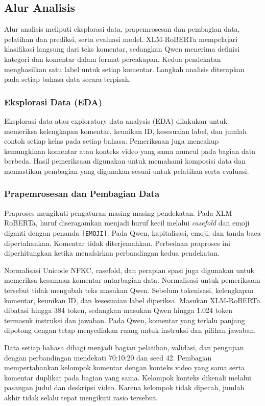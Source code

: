 \documentclass[11pt]{article}
\begin{document}
\subsection{Alur Analisis}
Alur analisis meliputi eksplorasi data, prapemrosesan dan pembagian data, pelatihan dan prediksi, serta evaluasi model. XLM-RoBERTa mempelajari klasifikasi langsung dari teks komentar, sedangkan Qwen menerima definisi kategori dan komentar dalam format percakapan. Kedua pendekatan menghasilkan satu label untuk setiap komentar. Langkah analisis diterapkan pada setiap bahasa data secara terpisah.

\subsubsection{Eksplorasi Data (EDA)}
Eksplorasi data atau exploratory data analysis (EDA) dilakukan untuk memeriksa kelengkapan komentar, keunikan ID, kesesuaian label, dan jumlah contoh setiap kelas pada setiap bahasa. Pemeriksaan juga mencakup kemungkinan komentar atau konteks video yang sama muncul pada bagian data berbeda. Hasil pemeriksaan digunakan untuk memahami komposisi data dan memastikan pembagian yang digunakan sesuai untuk pelatihan serta evaluasi.

\subsubsection{Prapemrosesan dan Pembagian Data}
Praproses mengikuti pengaturan masing-masing pendekatan. Pada XLM-RoBERTa, huruf diseragamkan menjadi huruf kecil melalui \textit{casefold} dan emoji diganti dengan penanda \texttt{[EMOJI]}. Pada Qwen, kapitalisasi, emoji, dan tanda baca dipertahankan. Komentar tidak diterjemahkan. Perbedaan praproses ini diperhitungkan ketika menafsirkan perbandingan kedua pendekatan.

Normalisasi Unicode NFKC, casefold, dan perapian spasi juga digunakan untuk memeriksa kesamaan komentar antarbagian data. Normalisasi untuk pemeriksaan tersebut tidak mengubah teks masukan Qwen. Sebelum tokenisasi, kelengkapan komentar, keunikan ID, dan kesesuaian label diperiksa. Masukan XLM-RoBERTa dibatasi hingga 384 token, sedangkan masukan Qwen hingga 1.024 token termasuk instruksi dan jawaban. Pada Qwen, komentar yang terlalu panjang dipotong dengan tetap menyediakan ruang untuk instruksi dan pilihan jawaban.

Data setiap bahasa dibagi menjadi bagian pelatihan, validasi, dan pengujian dengan perbandingan mendekati 70:10:20 dan seed 42. Pembagian mempertahankan kelompok komentar dengan konteks video yang sama serta komentar duplikat pada bagian yang sama. Kelompok konteks dikenali melalui pasangan judul dan deskripsi video. Karena kelompok tidak dipecah, jumlah akhir tidak selalu tepat mengikuti rasio tersebut.
\end{document}
